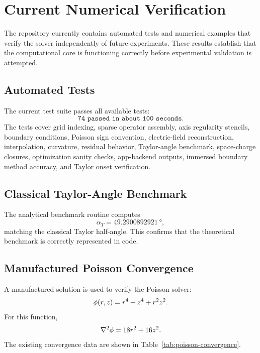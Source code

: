 \section{Current Numerical Verification}

The repository currently contains automated tests and numerical examples that verify the solver independently of future experiments. These results establish that the computational core is functioning correctly before experimental validation is attempted.

\subsection{Automated Tests}

The current test suite passes all available tests:
\begin{equation*}
\texttt{74 passed in about 100 seconds}.
\end{equation*}
The tests cover grid indexing, sparse operator assembly, axis regularity stencils, boundary conditions, Poisson sign convention, electric-field reconstruction, interpolation, curvature, residual behavior, Taylor-angle benchmark, space-charge closures, optimization sanity checks, app-backend outputs, immersed boundary method accuracy, and Taylor onset verification.

\subsection{Classical Taylor-Angle Benchmark}

The analytical benchmark routine computes
\begin{equation*}
\alpha_T = \SI{49.2900892921}{\degree},
\end{equation*}
matching the classical Taylor half-angle. This confirms that the theoretical benchmark is correctly represented in code.

\subsection{Manufactured Poisson Convergence}

A manufactured solution is used to verify the Poisson solver:
\begin{equation}
\phi(r,z)=r^4+z^4+r^2z^2.
\end{equation}
For this function,
\begin{equation}
\nabla^2\phi=18r^2+16z^2.
\end{equation}
The existing convergence data are shown in Table~\ref{tab:poisson-convergence}.

